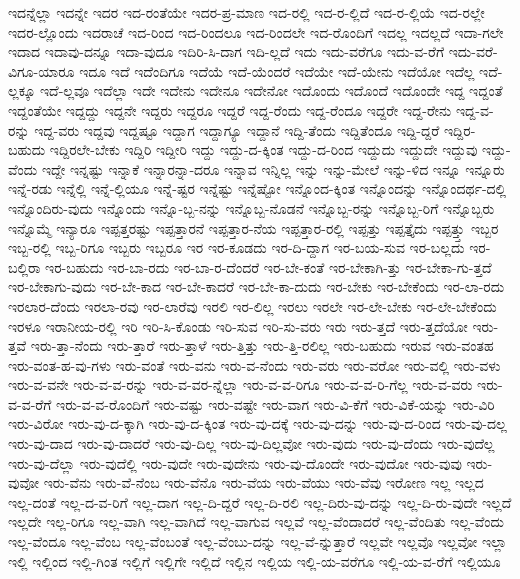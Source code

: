 {ಇದನ್ನೆಲ್ಲಾ
ಇದನ್ನೇ
ಇದರ
ಇದ-ರಂತೆಯೇ
ಇದರ-ಪ್ರ-ಮಾಣ
ಇದ-ರಲ್ಲಿ
ಇದ-ರ-ಲ್ಲಿದೆ
ಇದ-ರ-ಲ್ಲಿಯೆ
ಇದ-ರಲ್ಲೇ
ಇದರ-ಲ್ಲೊಂದು
ಇದರಾಚೆ
ಇದ-ರಿಂದ
ಇದ-ರಿಂದಲೂ
ಇದ-ರಿಂದಲೇ
ಇದ-ರೊಂದಿಗೆ
ಇದಲ್ಲ
ಇದಲ್ಲದೆ
ಇದಾ-ಗಲೇ
ಇದಾದ
ಇದಾವು-ದನ್ನೂ
ಇದಾ-ವುದೂ
ಇದಿರಿ-ಸಿ-ದಾಗ
ಇದಿ-ಲ್ಲದೆ
ಇದು
ಇದು-ವರೆಗೂ
ಇದು-ವ-ರೆಗೆ
ಇದು-ವರೆ-ವಿಗೂ-ಯಾರೂ
ಇದೂ
ಇದೆ
ಇದೆಂದಿಗೂ
ಇದೆಯೆ
ಇದೆ-ಯೆಂದರೆ
ಇದೆಯೇ
ಇದೆ-ಯೇನು
ಇದೆಯೋ
ಇದೆಲ್ಲ
ಇದೆ-ಲ್ಲಕ್ಕೂ
ಇದೆ-ಲ್ಲವೂ
ಇದೆಲ್ಲಾ
ಇದೇ
ಇದೇನು
ಇದೇನೂ
ಇದೇನೋ
ಇದೊಂದು
ಇದೊಂದೆ
ಇದೊಂದೇ
ಇದ್ದ
ಇದ್ದಂತೆ
ಇದ್ದಂತೆಯೇ
ಇದ್ದದ್ದು
ಇದ್ದನೇ
ಇದ್ದರು
ಇದ್ದರೂ
ಇದ್ದರೆ
ಇದ್ದ-ರೆಂದು
ಇದ್ದ-ರೆಂದೂ
ಇದ್ದರೇ
ಇದ್ದ-ರೇನು
ಇದ್ದ-ವ-ರನ್ನು
ಇದ್ದ-ವರು
ಇದ್ದವು
ಇದ್ದಷ್ಟೂ
ಇದ್ದಾಗ
ಇದ್ದಾಗ್ಯೂ
ಇದ್ದಾನೆ
ಇದ್ದಿ-ತೆಂದು
ಇದ್ದಿತೆಂದೂ
ಇದ್ದಿ-ದ್ದರೆ
ಇದ್ದಿರ-ಬಹುದು
ಇದ್ದಿರಲೇ-ಬೇಕು
ಇದ್ದಿರಿ
ಇದ್ದೀರಿ
ಇದ್ದು
ಇದ್ದು-ದ-ಕ್ಕಿಂತ
ಇದ್ದು-ದ-ರಿಂದ
ಇದ್ದುದು
ಇದ್ದುದೇ
ಇದ್ದುವು
ಇದ್ದು-ವೆಂದು
ಇದ್ದೇ
ಇನ್ನಷ್ಟು
ಇನ್ನಾಕೆ
ಇನ್ನಾರನ್ನಾ-ದರೂ
ಇನ್ನಾವ
ಇನ್ನಿಲ್ಲ
ಇನ್ನು
ಇನ್ನು-ಮೇಲೆ
ಇನ್ನು-ಳಿದ
ಇನ್ನೂ
ಇನ್ನೂರು
ಇನ್ನೆ-ರಡು
ಇನ್ನೆಲ್ಲಿ
ಇನ್ನೆ-ಲ್ಲಿಯೂ
ಇನ್ನೆ-ಷ್ಟರ
ಇನ್ನೆಷ್ಟು
ಇನ್ನೆಷ್ಟೋ
ಇನ್ನೊಂದ-ಕ್ಕಿಂತ
ಇನ್ನೊಂದನ್ನು
ಇನ್ನೊಂದರ್ಥ-ದಲ್ಲಿ
ಇನ್ನೊಂದಿರು-ವುದು
ಇನ್ನೊಂದು
ಇನ್ನೊ-ಬ್ಬ-ನನ್ನು
ಇನ್ನೊಬ್ಬ-ನೊಡನೆ
ಇನ್ನೊಬ್ಬ-ರನ್ನು
ಇನ್ನೊಬ್ಬ-ರಿಗೆ
ಇನ್ನೊಬ್ಬರು
ಇನ್ನೊಮ್ಮೆ
ಇನ್ಯಾರೂ
ಇಪ್ಪತ್ತರಷ್ಟು
ಇಪ್ಪತ್ತಾರನೆ
ಇಪ್ಪತ್ತಾರ-ನೆಯ
ಇಪ್ಪತ್ತಾರ-ರಲ್ಲಿ
ಇಪ್ಪತ್ತು
ಇಪ್ಪತ್ತೈದು
ಇಪ್ಪತ್ತ್ತು
ಇಬ್ಬರ
ಇಬ್ಬ-ರಲ್ಲಿ
ಇಬ್ಬ-ರಿಗೂ
ಇಬ್ಬರು
ಇಬ್ಬರೂ
ಇರ
ಇರ-ಕೂಡದು
ಇರ-ದಿ-ದ್ದಾಗ
ಇರ-ಬಯ-ಸುವ
ಇರ-ಬಲ್ಲದು
ಇರ-ಬಲ್ಲಿರಾ
ಇರ-ಬಹುದು
ಇರ-ಬಾ-ರದು
ಇರ-ಬಾ-ರ-ದೆಂದರೆ
ಇರ-ಬೇ-ಕಂತೆ
ಇರ-ಬೇಕಾಗಿ-ತ್ತು
ಇರ-ಬೇಕಾ-ಗು-ತ್ತದೆ
ಇರ-ಬೇಕಾಗು-ವುದು
ಇರ-ಬೇ-ಕಾದ
ಇರ-ಬೇ-ಕಾದರೆ
ಇರ-ಬೇ-ಕಾ-ದುದು
ಇರ-ಬೇಕು
ಇರ-ಬೇಕೆಂದು
ಇರ-ಲಾ-ರದು
ಇರಲಾರ-ದೆಂದು
ಇರಲಾ-ರವು
ಇರ-ಲಾರೆವು
ಇರಲಿ
ಇರ-ಲಿಲ್ಲ
ಇರಲು
ಇರಲೇ
ಇರ-ಲೇ-ಬೇಕು
ಇರ-ಲೇ-ಬೇಕೆಂದು
ಇರಳೂ
ಇರಾನೀಯ-ರಲ್ಲಿ
ಇರಿ
ಇರಿ-ಸಿ-ಕೊಂಡು
ಇರಿ-ಸುವ
ಇರಿ-ಸು-ವರು
ಇರು
ಇರು-ತ್ತದೆ
ಇರು-ತ್ತದೆಯೋ
ಇರು-ತ್ತವೆ
ಇರು-ತ್ತಾ-ನೆಂದು
ಇರು-ತ್ತಾರೆ
ಇರು-ತ್ತಾಳೆ
ಇರು-ತ್ತಿತ್ತು
ಇರು-ತ್ತಿ-ರಲಿಲ್ಲ
ಇರು-ಬಹುದು
ಇರುವ
ಇರು-ವಂತಹ
ಇರು-ವಂತ-ಹ-ವು-ಗಳು
ಇರು-ವಂತೆ
ಇರು-ವನು
ಇರು-ವ-ನೆಂದು
ಇರು-ವರು
ಇರು-ವರೋ
ಇರು-ವಲ್ಲಿ
ಇರು-ವಳು
ಇರು-ವ-ವನೇ
ಇರು-ವ-ವ-ರನ್ನು
ಇರು-ವ-ವರ-ನ್ನೆಲ್ಲಾ
ಇರು-ವ-ವ-ರಿಗೂ
ಇರು-ವ-ವ-ರಿ-ಗೆಲ್ಲ
ಇರು-ವ-ವರು
ಇರು-ವ-ವ-ರೆಗೆ
ಇರು-ವ-ವ-ರೊಂದಿಗೆ
ಇರು-ವಷ್ಟು
ಇರು-ವಷ್ಟೇ
ಇರು-ವಾಗ
ಇರು-ವಿ-ಕೆಗೆ
ಇರು-ವಿಕೆ-ಯನ್ನು
ಇರು-ವಿರಿ
ಇರು-ವಿರೋ
ಇರು-ವು-ದ-ಕ್ಕಾಗಿ
ಇರು-ವು-ದ-ಕ್ಕಿಂತ
ಇರು-ವು-ದಕ್ಕೆ
ಇರು-ವು-ದನ್ನು
ಇರು-ವು-ದ-ರಿಂದ
ಇರು-ವು-ದಲ್ಲ
ಇರು-ವು-ದಾದ
ಇರು-ವು-ದಾದರೆ
ಇರು-ವು-ದಿಲ್ಲ
ಇರು-ವು-ದಿಲ್ಲವೋ
ಇರು-ವುದು
ಇರು-ವು-ದೆಂದು
ಇರು-ವುದೆಲ್ಲ
ಇರು-ವು-ದೆಲ್ಲಾ
ಇರು-ವುದೆಲ್ಲಿ
ಇರು-ವುದೇ
ಇರು-ವುದೇನು
ಇರು-ವು-ದೊಂದೇ
ಇರು-ವುದೋ
ಇರು-ವುವು
ಇರು-ವುವೋ
ಇರು-ವೆನು
ಇರು-ವೆ-ನೆಂಬ
ಇರು-ವೆನೊ
ಇರು-ವೆಯ
ಇರು-ವೆಯು
ಇರು-ವೆವು
ಇರೋಣ
ಇಲ್ಲ
ಇಲ್ಲದ
ಇಲ್ಲ-ದಂತೆ
ಇಲ್ಲ-ದ-ವ-ರಿಗೆ
ಇಲ್ಲ-ದಾಗ
ಇಲ್ಲ-ದಿ-ದ್ದರೆ
ಇಲ್ಲ-ದಿ-ರಲಿ
ಇಲ್ಲ-ದಿರು-ವು-ದನ್ನು
ಇಲ್ಲ-ದಿ-ರು-ವುದೇ
ಇಲ್ಲದೆ
ಇಲ್ಲದೇ
ಇಲ್ಲ-ರಿಗೂ
ಇಲ್ಲ-ವಾಗಿ
ಇಲ್ಲ-ವಾಗಿದೆ
ಇಲ್ಲ-ವಾಗುವ
ಇಲ್ಲವೆ
ಇಲ್ಲ-ವೆಂದಾದರೆ
ಇಲ್ಲ-ವೆಂದಿತು
ಇಲ್ಲ-ವೆಂದು
ಇಲ್ಲ-ವೆಂದೂ
ಇಲ್ಲ-ವೆಂಬ
ಇಲ್ಲ-ವೆಂಬಂತೆ
ಇಲ್ಲ-ವೆಂಬು-ದನ್ನು
ಇಲ್ಲ-ವೆ-ನ್ನುತ್ತಾರೆ
ಇಲ್ಲವೇ
ಇಲ್ಲವೊ
ಇಲ್ಲವೋ
ಇಲ್ಲಾ
ಇಲ್ಲಿ
ಇಲ್ಲಿಂದ
ಇಲ್ಲಿ-ಗಿಂತ
ಇಲ್ಲಿಗೆ
ಇಲ್ಲಿಗೇ
ಇಲ್ಲಿದೆ
ಇಲ್ಲಿನ
ಇಲ್ಲಿಯ
ಇಲ್ಲಿ-ಯ-ವರೆಗೂ
ಇಲ್ಲಿ-ಯ-ವ-ರೆಗೆ
ಇಲ್ಲಿಯೂ
}

